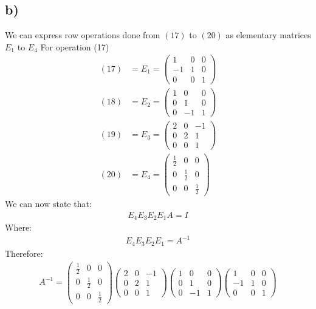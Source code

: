 \documentclass[12pt]{article}
\begin{document}
\subsection{b)}
We can express row operations done from $(17)$ to $(20)$ as elementary matrices $E_1$ to $E_4$
For operation (17)
\begin{align*}
(17)&=E_1=
\left(\begin{array}{ccc}
1 & 0 & 0 \\
-1 & 1 & 0 \\
0 & 0 & 1
\end{array}\right)
\\
(18)&=E_2=
\left(\begin{array}{ccc}
1 & 0 & 0 \\
0 & 1 & 0 \\
0 & -1 & 1
\end{array}\right)
\\
(19)&=E_3=
\left(\begin{array}{ccc}
2 & 0 & -1 \\
0 & 2 & 1 \\
0 & 0 & 1
\end{array}\right)
\\
(20)&=E_4=
\left(\begin{array}{ccc}
\frac{1}{2} & 0 & 0 \\
0 & \frac{1}{2} & 0 \\
0 & 0 & \frac{1}{2}
\end{array}\right)
\end{align*}
We can now state that:
\begin{align}
E_4E_3E_2E_1A=I
\end{align}
Where:
\begin{align}
E_4E_3E_2E_1=A^{-1}
\end{align}
Therefore:
\begin{align*}
A^{-1}=\left(\begin{array}{ccc}
\frac{1}{2} & 0 & 0 \\
0 & \frac{1}{2} & 0 \\
0 & 0 & \frac{1}{2}
\end{array}\right)
\left(\begin{array}{ccc}
2 & 0 & -1 \\
0 & 2 & 1 \\
0 & 0 & 1
\end{array}\right)
\left(\begin{array}{ccc}
1 & 0 & 0 \\
0 & 1 & 0 \\
0 & -1 & 1
\end{array}\right)
\left(\begin{array}{ccc}
1 & 0 & 0 \\
-1 & 1 & 0 \\
0 & 0 & 1
\end{array}\right)
\end{align*}
\end{document}
